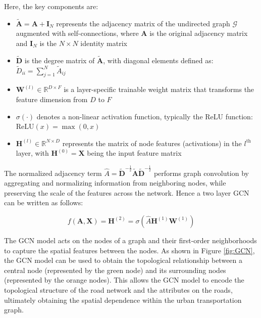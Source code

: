 \documentclass[pdflatex,sn-mathphys-num]{sn-jnl}%
\theoremstyle{thmstyleone}%
\theoremstyle{thmstyletwo}%
\theoremstyle{thmstylethree}%
\begin{document}
Here, the key components are:

\begin{itemize}
\item $\tilde{\mathbf{A}} = \mathbf{A} + \mathbf{I}_N$ represents the adjacency matrix of the undirected graph $\mathcal{G}$ augmented with self-connections, where $\mathbf{A}$ is the original adjacency matrix and $\mathbf{I}_N$ is the $N \times N$ identity matrix
\item $\tilde{\mathbf{D}}$ is the degree matrix of $\tilde{\mathbf{A}}$, with diagonal elements defined as:
$
\tilde{D}_{ii} = \sum_{j=1}^N \tilde{A}_{ij}
$%
\item $\mathbf{W}^{(l)} \in \mathbb{R}^{D \times F}$ is a layer-specific trainable weight matrix that transforms the feature dimension from $D$ to $F$
\item $\sigma(\cdot)$ denotes a non-linear activation function, typically the ReLU function: 
$\mathrm{ReLU}(x) = \max(0,x)$
\item $\mathbf{H}^{(l)} \in \mathbb{R}^{N \times D}$ represents the matrix of node features (activations) in the $l^{\text{th}}$ layer, with $\mathbf{H}^{(0)}=\mathbf{X}$ being the input feature matrix
\end{itemize}

The normalized adjacency term 
$\hat{A}=\tilde{\mathbf{D}}^{-\frac{1}{2}} \tilde{\mathbf{A}}\tilde{\mathbf{D}}^{-\frac{1}{2}}$ performs graph convolution by aggregating and normalizing information from neighboring nodes, while preserving the scale of the features across the network. Hence a two layer GCN can be written as follows:

\begin{equation}
  \textstyle
  f(\textbf{A},\textbf{X})=\mathbf{H}^{(2)}= \sigma\!\left(\hat{A}\mathbf{H}^{(1)} \mathbf{W}^{(1)} \right)
\label{eq:two-layer-gcn}
\end{equation}

The GCN model acts on the nodes of a graph and their first-order neighborhoods to capture the spatial features between the nodes. As shown in Figure \ref{fig:GCN}, the GCN model can be used to obtain the topological relationship between a central node (represented by the green node) and its surrounding nodes (represented by the orange nodes). This allows the GCN model to encode the topological structure of the road network and the attributes on the roads, ultimately obtaining the spatial dependence within the urban transportation graph.
\end{document}

